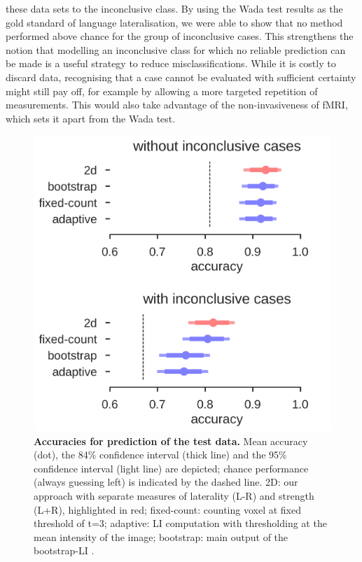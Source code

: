 \documentclass[fleqn,10pt]{SelfArx} %
\begin{document}
these data sets to the inconclusive class. By using the Wada test results as the gold standard of language lateralisation, we were able to show that no method performed above chance for the group of inconclusive cases. This strengthens the notion that modelling an inconclusive class for which no reliable prediction can be made is a useful strategy to reduce misclassifications. While it is costly to discard data, recognising that a case cannot be evaluated with sufficient certainty might still pay off, for example by allowing a more targeted repetition of measurements. This would also take advantage of the non-invasiveness of fMRI, which sets it apart from the Wada test.\\

\begin{figure}[h]	
	\renewcommand{\familydefault}{\sfdefault}\normalfont
	\centering
	\includegraphics[width=0.8\columnwidth]{../reports/figures/15-comparison-with-li-tool.png}
	\caption{\textbf{Accuracies for prediction of the test data.} Mean accuracy (dot), the 84\% confidence interval (thick line) and the 95\% confidence interval (light line) are depicted; chance performance (always guessing left) is indicated by the dashed line. 2D: our approach with separate measures of laterality (L-R) and strength (L+R), highlighted in red; fixed-count: counting voxel at fixed threshold of t=3; adaptive: LI computation with thresholding at the mean intensity of the image; bootstrap: main output of the bootstrap-LI \citep{Wilke_2006}.}%
	\label{fig:predli}
\end{figure}
\end{document}
